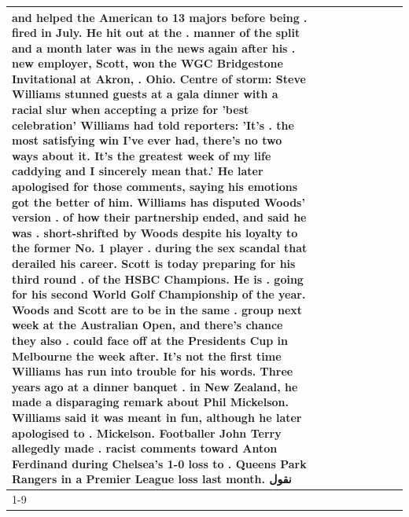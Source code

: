\begin{table}[H]
\begin{tabular}{lllrlllll}
and helped the American to 13 majors before being . fired in July. He hit out at the . manner of the split and a month later was in the news again after his . new employer, Scott, won the WGC Bridgestone Invitational at Akron, . Ohio. Centre of storm: Steve Williams stunned guests at a gala dinner with a racial slur when accepting a prize for 'best celebration' Williams had told reporters: 'It's . the most satisfying win I've ever had, there's no two ways about it. It's the greatest week of my life caddying and I sincerely mean that.' He later apologised for those comments, saying his emotions got the better of him. Williams has disputed Woods' version . of how their partnership ended, and said he was . short-shrifted by Woods despite his loyalty to the former No. 1 player . during the sex scandal that derailed his career. Scott is today preparing for his third round . of the HSBC Champions. He is . going for his second World Golf Championship of the year. Woods and Scott are to be in the same . group next week at the Australian Open, and there's chance they also . could face off at the Presidents Cup in Melbourne the week after. It's not the first time Williams has run into trouble for his words. Three years ago at a dinner banquet . in New Zealand, he made a disparaging remark about Phil Mickelson. Williams said it was meant in fun, although he later apologised to . Mickelson. Footballer John Terry allegedly made . racist comments toward Anton Ferdinand during Chelsea's 1-0 loss to . Queens Park Rangers in a Premier League loss last month. نقول \\
\cline{1-9}

\end{tabular}
\end{table}
